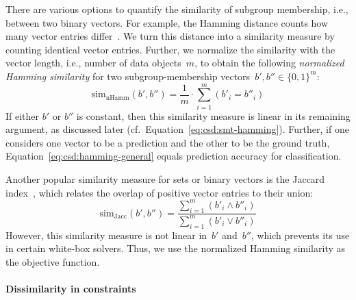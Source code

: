 \documentclass{article}
\theoremstyle{definition}
\begin{document}
There are various options to quantify the similarity of subgroup membership, i.e., between two binary vectors.
For example, the Hamming distance counts how many vector entries differ~\cite{choi2010survey}.
We turn this distance into a similarity measure by counting identical vector entries.
Further, we normalize the similarity with the vector length, i.e., number of data objects~$m$, to obtain the following \emph{normalized Hamming similarity} for two subgroup-membership vectors~$b', b'' \in \{0, 1\}^m$:
%
\begin{equation}
	\text{sim}_{\text{nHamm}}(b', b'') = \frac{1}{m} \cdot \sum_{i=1}^{m} (b'_i = b''_i)
	\label{eq:csd:hamming-general}
\end{equation}
%
If either $b'$ or $b''$ is constant, then this similarity measure is linear in its remaining argument, as discussed later (cf.~Equation~\ref{eq:csd:smt-hamming}).
Further, if one considers one vector to be a prediction and the other to be the ground truth, Equation~\ref{eq:csd:hamming-general} equals prediction accuracy for classification.

Another popular similarity measure for sets or binary vectors is the Jaccard index~\cite{choi2010survey}, which relates the overlap of positive vector entries to their union:
%
\begin{equation}
	\text{sim}_{\text{Jacc}}(b', b'') = \frac{\sum_{i=1}^{m} (b'_i \land b''_i)}{\sum_{i=1}^{m} (b'_i \lor b''_i)}
	\label{eq:csd:jaccard}
\end{equation}
%
However, this similarity measure is not linear in~$b'$ and~$b''$, which prevents its use in certain white-box solvers.
Thus, we use the normalized Hamming similarity as the objective function.

\paragraph{Dissimilarity in constraints}
\end{document}
